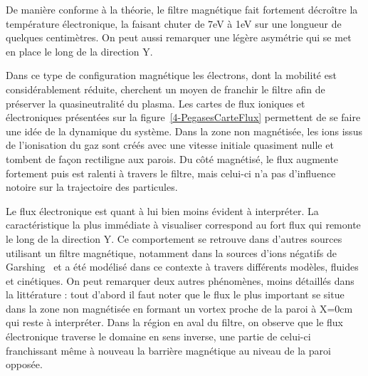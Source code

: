 \begin{refsection}
De manière conforme à la théorie, le filtre magnétique fait fortement décroître
la température électronique, la faisant chuter de 7eV à 1eV sur une
longueur de quelques centimètres. On peut aussi remarquer une légère asymétrie qui se met en
place le long de la direction Y. 

Dans ce type de configuration
magnétique les électrons, dont la mobilité est considérablement réduite,
cherchent un moyen de franchir le filtre afin de préserver la quasineutralité du
plasma. Les cartes de flux ioniques et électroniques présentées sur la figure~\ref{4-PegasesCarteFlux} permettent de se faire une idée de la dynamique
du système. Dans la zone non magnétisée, les ions issus de l'ionisation du gaz
sont créés avec une vitesse initiale quasiment nulle et tombent de façon
rectiligne aux parois. Du côté magnétisé, le flux augmente fortement puis est
ralenti à travers le filtre, mais celui-ci n'a pas d'influence notoire sur la
trajectoire des particules.

Le flux électronique est quant à lui bien moins évident à interpréter. La
caractéristique la plus immédiate à visualiser correspond au fort flux qui
remonte le long de la direction Y. Ce comportement se retrouve dans d'autres
sources utilisant un filtre magnétique, notamment dans la
sources d'ions négatifs de Garshing~\parencite{GarshingFiltre} et a été modélisé
dans ce contexte à travers différents
modèles, fluides et cinétiques\parencite{PIC2D-PIC3D-MAGMA}. On peut remarquer
deux autres phénomènes, moins détaillés dans la littérature : tout d'abord il
faut noter que le flux le plus important se situe dans la zone non magnétisée en
formant un vortex proche de la paroi à X=0cm qui reste à interpréter. Dans la
région en aval du filtre, on observe que le flux
électronique traverse le domaine en sens inverse, une partie
de celui-ci franchissant même à nouveau la barrière magnétique au niveau de la
paroi opposée.


\end{refsection}
